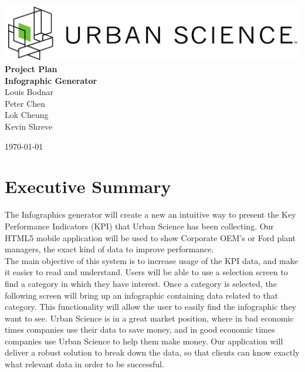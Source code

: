 \documentclass[11pt,a4paper,oneside]{article}
\begin{document}
\begin{titlepage}

\begin{center}

\includegraphics[width=1\textwidth]{images/sponsor-logo.png}\\[1cm]    

{ \huge \bfseries Project Plan}\\[0.4cm]
{ \large \bfseries Infographic Generator}\\[0.4cm]

Louis Bodnar\\
Peter Chen\\
Lok Cheung\\
Kevin Shreve\\



\vfill

{\large \today}

\end{center}

\end{titlepage}

\tableofcontents

\newpage

\listoffigures

\newpage

\section{Executive Summary}


The Infographics generator will create a new an intuitive way to present the Key Performance Indicators (KPI) that Urban Science has been collecting. Our HTML5 mobile application will be used to show Corporate OEM’s or Ford plant managers, the exact kind of data to improve performance.\\

The main objective of this system is to increase usage of the KPI data, and make it easier to read and understand. Users will be able to use a selection screen to find a category in which they have interest. Once a category is selected, the following screen will bring up an infographic containing data related to that category. This functionality will allow the user to easily find the infographic they want to see. Urban Science is in a great market position, where in bad economic times companies use their data to save money, and in good economic times companies use Urban Science to help them make money. Our application will deliver a robust solution to break down the data, so that clients can know exactly what relevant data in order to be successful.\\
\end{document}
